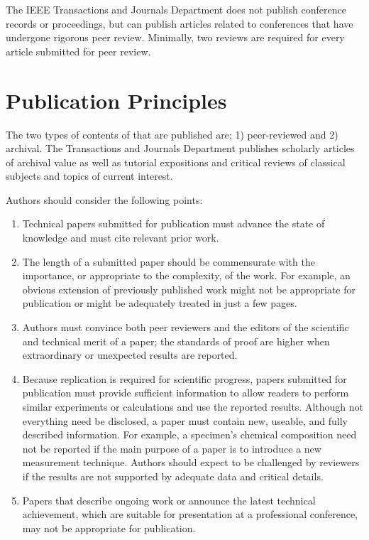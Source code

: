 \documentclass[journal,twoside,web]{ieeecolor}
\begin{document}
The IEEE Transactions and Journals Department does not publish conference 
records or proceedings, but can publish articles related to conferences that 
have undergone rigorous peer review. Minimally, two reviews are required for 
every article submitted for peer review.

\section{Publication Principles}
The two types of contents of that are published are; 1) peer-reviewed and 2) 
archival. The Transactions and Journals Department publishes scholarly 
articles of archival value as well as tutorial expositions and critical 
reviews of classical subjects and topics of current interest. 

Authors should consider the following points:

\begin{enumerate}
\item Technical papers submitted for publication must advance the state of knowledge and must cite relevant prior work. 
\item The length of a submitted paper should be commensurate with the importance, or appropriate to the complexity, of the work. For example, an obvious extension of previously published work might not be appropriate for publication or might be adequately treated in just a few pages.
\item Authors must convince both peer reviewers and the editors of the scientific and technical merit of a paper; the standards of proof are higher when extraordinary or unexpected results are reported. 
\item Because replication is required for scientific progress, papers submitted for publication must provide sufficient information to allow readers to perform similar experiments or calculations and 
use the reported results. Although not everything need be disclosed, a paper 
must contain new, useable, and fully described information. For example, a 
specimen's chemical composition need not be reported if the main purpose of 
a paper is to introduce a new measurement technique. Authors should expect 
to be challenged by reviewers if the results are not supported by adequate 
data and critical details.
\item Papers that describe ongoing work or announce the latest technical achievement, which are suitable for presentation at a professional conference, may not be appropriate for publication.
\end{enumerate}
\end{document}
